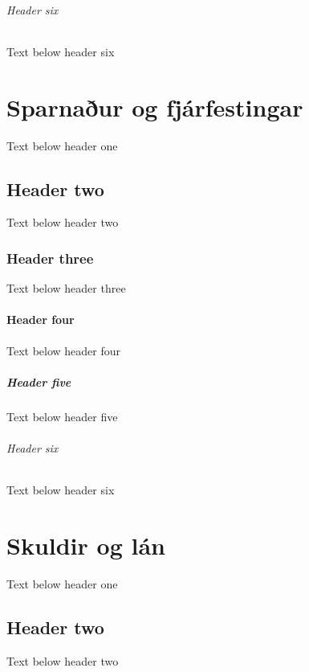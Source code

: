 \documentclass[a4paper,10pt,icelandic]{sphinxmanual}
\begin{document}
\subparagraph{Header six}
\label{\detokenize{gerd-fjarhagsaaetlunar/index:header-six}}
\sphinxAtStartPar
Text below header six

\sphinxstepscope


\chapter{Sparnaður og fjárfestingar}
\label{\detokenize{sparnadur-og-fjarfestingar/index:sparnaur-og-fjarfestingar}}\label{\detokenize{sparnadur-og-fjarfestingar/index::doc}}
\sphinxAtStartPar
Text below header one


\section{Header two}
\label{\detokenize{sparnadur-og-fjarfestingar/index:header-two}}
\sphinxAtStartPar
Text below header two


\subsection{Header three}
\label{\detokenize{sparnadur-og-fjarfestingar/index:header-three}}
\sphinxAtStartPar
Text below header three


\subsubsection{Header four}
\label{\detokenize{sparnadur-og-fjarfestingar/index:header-four}}
\sphinxAtStartPar
Text below header four


\paragraph{Header five}
\label{\detokenize{sparnadur-og-fjarfestingar/index:header-five}}
\sphinxAtStartPar
Text below header five


\subparagraph{Header six}
\label{\detokenize{sparnadur-og-fjarfestingar/index:header-six}}
\sphinxAtStartPar
Text below header six

\sphinxstepscope


\chapter{Skuldir og lán}
\label{\detokenize{skuldir-og-lan/index:skuldir-og-lan}}\label{\detokenize{skuldir-og-lan/index::doc}}
\sphinxAtStartPar
Text below header one


\section{Header two}
\label{\detokenize{skuldir-og-lan/index:header-two}}
\sphinxAtStartPar
Text below header two
\end{document}
